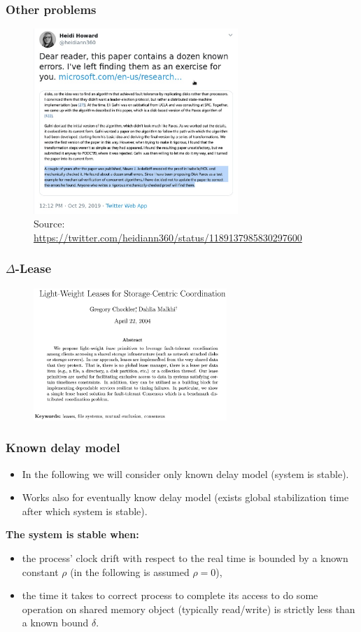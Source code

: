 \documentclass[10pt,utf8]{beamer}
\begin{document}
\begin{frame}
 \frametitle{Other problems}
 \centering
 \begin{figure}
        \centering
        \includegraphics[height=7cm]{./img/howard_disk_paxos.eps}
        \caption{\tiny{Source: \url{https://twitter.com/heidiann360/status/1189137985830297600}}}
    \end{figure}
\end{frame}


\begin{frame}
    \frametitle{$\Delta$-Lease}
    \begin{figure}
        \centering
        \includegraphics[height=5cm]{./img/delta-leases-paper.eps}
    \end{figure}
\end{frame}

\begin{frame}
    \frametitle{Known delay model}
    \begin{itemize}
     \item In the following we will consider only known delay model (system is stable).
     \item Works also for eventually know delay model (exists global stabilization time after which system is stable).
    \end{itemize}
    
    \vspace{1cm}
    
    \centering
    \textbf{The system is stable when:}
    \begin{itemize}
     \item the process' clock drift with respect to the real time is bounded by a known constant $\rho$ (in the following is assumed $\rho=0$),
     \item the time it takes to correct process to complete its access to do some operation on shared memory object (typically read/write) is strictly less than a known bound $\delta$.
    \end{itemize}
\end{frame}
\end{document}
